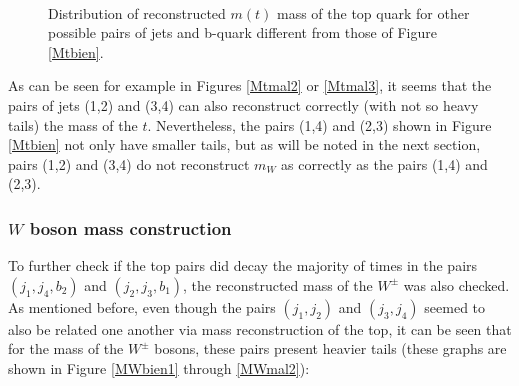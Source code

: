 \begin{figure}[ht!]
     \begin{center}
        \\
    \end{center}
    \caption{Distribution of reconstructed $m(t)$ mass of the top quark for other possible pairs of jets and b-quark different from those of Figure \ref{Mtbien}.} 
    \label{Mtmal}
\end{figure}

As can be seen for example in Figures \ref{Mtmal2} or \ref{Mtmal3}, it seems that the pairs of jets (1,2) and (3,4) can also reconstruct correctly (with not so heavy tails) the mass of the $t$. Nevertheless, the pairs (1,4) and (2,3) shown in Figure \ref{Mtbien} not only have smaller tails, but as will be noted in the next section, pairs (1,2) and (3,4) do not reconstruct $m_W$ as correctly as the pairs (1,4) and (2,3).

\subsubsection{$W$ boson mass construction}

To further check if the top pairs did decay the majority of times in the pairs $(j_1,j_4,b_2)$ and $(j_2,j_3,b_1)$, the reconstructed mass of the $W^{\pm}$ was also checked. As mentioned before, even though the pairs $(j_1, j_2)$ and $(j_3, j_4)$ seemed to also be related one another via mass reconstruction of the top, it can be seen that for the mass of the $W^{\pm}$ bosons, these pairs present heavier tails (these graphs are shown in Figure \ref{MWbien1} through \ref{MWmal2}):

